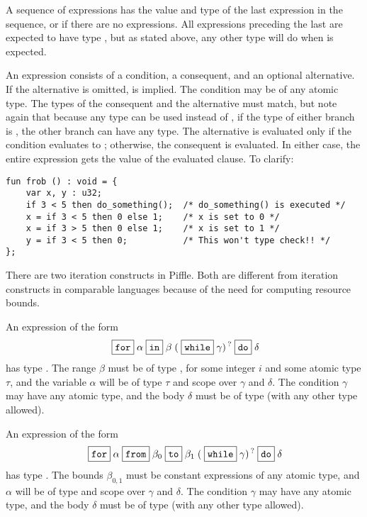 \documentclass[a4paper,12pt]{scrreprt}
\begin{document}
A sequence  of expressions has the value and type of the
last expression in the sequence, or  if there are no
expressions. All expressions preceding the last are expected to have
type , but as stated above, any other type will do when
 is expected.

An  expression consists of a condition, a consequent, and an
optional alternative. If the alternative is omitted,  is
implied. The condition may be of any atomic type. The types of the
consequent and the alternative must match, but note again that because
any type can be used instead of , if the type of either
branch is , the other branch can have any type. The
alternative is evaluated only if the condition evaluates to ;
otherwise, the consequent is evaluated. In either case, the entire
expression gets the value of the evaluated clause. To clarify:
\begin{verbatim}
fun frob () : void = {
    var x, y : u32;
    if 3 < 5 then do_something();  /* do_something() is executed */
    x = if 3 < 5 then 0 else 1;    /* x is set to 0 */
    x = if 3 > 5 then 0 else 1;    /* x is set to 1 */
    y = if 3 < 5 then 0;           /* This won't type check!! */
};
\end{verbatim}

There are two iteration constructs in Piffle. Both are different from
iteration constructs in comparable languages because of the need for
computing resource bounds. 

An expression of the form \[ \lit{for} \alpha \lit{in} \beta
   \grp{\lit{while} \gamma}\opt \lit{do} \delta \] has type
   . The range $\beta$ must be of type , for some integer $i$ and some atomic type $\tau$, and the
   variable $\alpha$ will be of type $\tau$ and scope over $\gamma$
   and $\delta$. The condition $\gamma$ may have any atomic type, and
   the body $\delta$ must be of type  (with any other type
   allowed).

An expression of the form \[ \lit{for} \alpha \lit{from} \beta_0
   \lit{to} \beta_1 \grp{\lit{while} \gamma}\opt \lit{do} \delta \]
   has type . The bounds $\beta_{0,1}$ must be constant
   expressions of any atomic type, and $\alpha$ will be of type
    and scope over $\gamma$ and $\delta$. The condition
   $\gamma$ may have any atomic type, and the body $\delta$ must be of
   type  (with any other type allowed).
\end{document}
